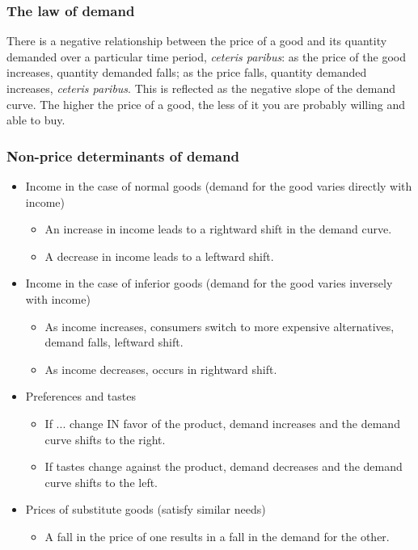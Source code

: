 \subsubsection*{The law of demand}
There is a negative relationship between the price of a good and its quantity demanded over a particular time period, \emph{ceteris paribus}: as the price of the good increases, quantity demanded falls; as the price falls, quantity demanded increases, \emph{ceteris paribus}. This is reflected as the negative slope of the demand curve. The higher the price of a good, the less of it you are probably willing and able to buy. 
\subsubsection*{Non-price determinants of demand}
\begin{itemize}
  \item Income in the case of normal goods (demand for the good varies directly with income)
  \begin{itemize}
    \item An increase in income leads to a rightward shift in the demand curve.
    \item A decrease in income leads to a leftward shift.
  \end{itemize}
  \item Income in the case of inferior goods (demand for the good varies inversely with income)
  \begin{itemize}
    \item As income increases, consumers switch to more expensive alternatives, demand falls, leftward shift.
    \item As income decreases, occurs in rightward shift.
  \end{itemize}
  \item Preferences and tastes
  \begin{itemize}
    \item If ... change IN favor of the product, demand increases and the demand curve shifts to the right.
    \item If tastes change against the product, demand decreases and the demand curve shifts to the left.
  \end{itemize}
  \item Prices of substitute goods (satisfy similar needs)
  \begin{itemize}
    \item A fall in the price of one results in a fall in the demand for the other.

\end{itemize}
\end{itemize}
